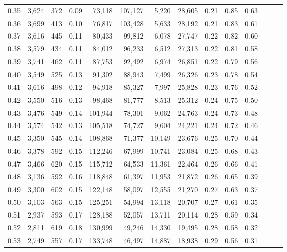 \begin{tabular}{rrrrrrrrrrrrrr}
0.35 &  3,624 &  372 &  0.09 &   73,118 &  107,127 &   5,220 &  28,605 &  0.21 &  0.85 &      0.63 \\
0.36 &  3,699 &  413 &  0.10 &   76,817 &  103,428 &   5,633 &  28,192 &  0.21 &  0.83 &      0.61 \\
0.37 &  3,616 &  445 &  0.11 &   80,433 &   99,812 &   6,078 &  27,747 &  0.22 &  0.82 &      0.60 \\
0.38 &  3,579 &  434 &  0.11 &   84,012 &   96,233 &   6,512 &  27,313 &  0.22 &  0.81 &      0.58 \\
0.39 &  3,741 &  462 &  0.11 &   87,753 &   92,492 &   6,974 &  26,851 &  0.22 &  0.79 &      0.56 \\
0.40 &  3,549 &  525 &  0.13 &   91,302 &   88,943 &   7,499 &  26,326 &  0.23 &  0.78 &      0.54 \\
0.41 &  3,616 &  498 &  0.12 &   94,918 &   85,327 &   7,997 &  25,828 &  0.23 &  0.76 &      0.52 \\
0.42 &  3,550 &  516 &  0.13 &   98,468 &   81,777 &   8,513 &  25,312 &  0.24 &  0.75 &      0.50 \\
0.43 &  3,476 &  549 &  0.14 &  101,944 &   78,301 &   9,062 &  24,763 &  0.24 &  0.73 &      0.48 \\
0.44 &  3,574 &  542 &  0.13 &  105,518 &   74,727 &   9,604 &  24,221 &  0.24 &  0.72 &      0.46 \\
0.45 &  3,350 &  545 &  0.14 &  108,868 &   71,377 &  10,149 &  23,676 &  0.25 &  0.70 &      0.44 \\
0.46 &  3,378 &  592 &  0.15 &  112,246 &   67,999 &  10,741 &  23,084 &  0.25 &  0.68 &      0.43 \\
0.47 &  3,466 &  620 &  0.15 &  115,712 &   64,533 &  11,361 &  22,464 &  0.26 &  0.66 &      0.41 \\
0.48 &  3,136 &  592 &  0.16 &  118,848 &   61,397 &  11,953 &  21,872 &  0.26 &  0.65 &      0.39 \\
0.49 &  3,300 &  602 &  0.15 &  122,148 &   58,097 &  12,555 &  21,270 &  0.27 &  0.63 &      0.37 \\
0.50 &  3,103 &  563 &  0.15 &  125,251 &   54,994 &  13,118 &  20,707 &  0.27 &  0.61 &      0.35 \\
0.51 &  2,937 &  593 &  0.17 &  128,188 &   52,057 &  13,711 &  20,114 &  0.28 &  0.59 &      0.34 \\
0.52 &  2,811 &  619 &  0.18 &  130,999 &   49,246 &  14,330 &  19,495 &  0.28 &  0.58 &      0.32 \\
0.53 &  2,749 &  557 &  0.17 &  133,748 &   46,497 &  14,887 &  18,938 &  0.29 &  0.56 &      0.31 \\

\end{tabular}
